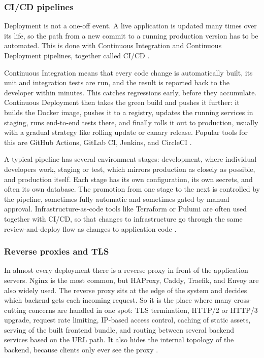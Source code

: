 \subsubsection{CI/CD pipelines}
\label{sec:cicd}

Deployment is not a one-off event. A live application is updated many times over its life, so the path from a new commit to a running production version has to be automated. This is done with Continuous Integration and Continuous Deployment pipelines, together called CI/CD \autocite{shahin2017cicd_slr, ali2023devops_cicd}.

Continuous Integration means that every code change is automatically built, its unit and integration tests are run, and the result is reported back to the developer within minutes. This catches regressions early, before they accumulate. Continuous Deployment then takes the green build and pushes it further: it builds the Docker image, pushes it to a registry, updates the running services in staging, runs end-to-end tests there, and finally rolls it out to production, usually with a gradual strategy like rolling update or canary release. Popular tools for this are GitHub Actions, GitLab CI, Jenkins, and CircleCI \autocite{singh2021cicd_cloud, istifarulah2023cicd_devops, goccia2022cicd_generator}.

A typical pipeline has several environment stages: development, where individual developers work, staging or test, which mirrors production as closely as possible, and production itself. Each stage has its own configuration, its own secrets, and often its own database. The promotion from one stage to the next is controlled by the pipeline, sometimes fully automatic and sometimes gated by manual approval. Infrastructure-as-code tools like Terraform or Pulumi are often used together with CI/CD, so that changes to infrastructure go through the same review-and-deploy flow as changes to application code \autocite{chatterjee2024cicd_devops, saxena2025devops_iac}.

\subsubsection{Reverse proxies and TLS}
\label{sec:reverse-proxy}

In almost every deployment there is a reverse proxy in front of the application servers. Nginx is the most common, but HAProxy, Caddy, Traefik, and Envoy are also widely used. The reverse proxy sits at the edge of the system and decides which backend gets each incoming request. So it is the place where many cross-cutting concerns are handled in one spot: TLS termination, HTTP/2 or HTTP/3 upgrade, request rate limiting, IP-based access control, caching of static assets, serving of the built frontend bundle, and routing between several backend services based on the URL path. It also hides the internal topology of the backend, because clients only ever see the proxy \autocite{nginx_docs_2025, devto_nginx_2024, solo_nginx}.

